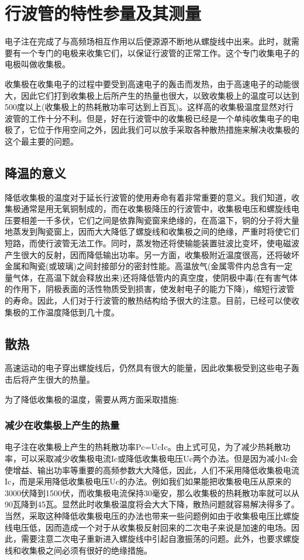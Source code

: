 \chapter{行波管的特性参量及其测量}
电子注在完成了与高频场相互作用以后便源源不断地从螺旋线中出来。此时，就需要有一个专门的电极来收集它们，以保证行波管的正常工作。这个专门收集电子的电极叫做收集极。


收集极在收集电子的过程中要受到高速电子的轰击而发热，由于高速电子的动能很大，因此它们打到收集极上后所产生的热量也很大，以致收集极上的温度可以达到500度以上(收集极上的热耗散功率可达到上百瓦)。这样高的收集极温度显然对行波管的工作十分不利。但是，好在行波管中的收集极已经是一个单纯收集电子的电极了，它位于作用空间之外，因此我们可以放手采取各种散热措施来解决收集极的这个最主要的问题。

\section{降温的意义}

降低收集极的温度对于延长行波管的使用寿命有着非常重要的意义。我们知道，收集极通常是用无氧铜制成的，而在收集极降压的行波管中，收集极电压和螺旋线电压要相差一千多伏，它们之间是依靠陶瓷窗来绝缘的，在高温下，铜的分子将大量地蒸发到陶瓷窗上，因而大大降低了螺旋线和收集极之间的绝缘，严重时将使它们短路，而使行波管无法工作。同时，蒸发物还将使输能装置驻波比变坏，使电磁波产生很大的反射，因而降低输出功率。另一方面，收集极附近温度很高，还将破坏金属和陶瓷(或玻璃)之间封接部分的密封性能。高温放气(金属零件内总含有一定量气体，在高温下就会释放出来)还将降低管内的真空度，使阴极中毒(在有害气体的作用下，阴极表面的活性物质受到损害，使发射电子的能力下降)，缩短行波管的寿命。因此，人们对于行波管的散热结构给予很大的注意。目前，已经可以使收集极的工作温度降低到几十度。
\section{散热}
高速运动的电子穿出螺旋线后，仍然具有很大的能量，因此收集极受到这些电子轰击后将产生很大的热量。


为了降低收集极的温度，需要从两方面采取措施:


\subsection{减少在收集极上产生的热量}

电子注在收集极上产生的热耗散功率Pc=UcIc。由上式可见，为了减少热耗散功率，可以采取减少收集极电流Ic或降低收集极电压Uc两个办法。但是因为减小Ic会使增益、输出功率等重要的高频参数大大降低，因此，人们不采用降低收集极电流Ic，而是采用降低收集极电压Uc的办法。例如我们如果能把收集极电压从原来的3000伏降到1500伏，而收集极电流保持30毫安，那么收集极的热耗散功率就可以从90瓦降到45瓦。显然此时收集极温度将会大大下降，散热问题就容易解决得多了。当然，采取这种降低收集极电压的办法也带来一些问题例如由于收集极电压比螺旋线电压低，因而造成一个对于从收集极反射回来的二次电子来说是加速的电场。因此，需要注意二次电子重新进入螺旋线中引起自激振荡的问题。此外，也要求螺旋线和收集极之间必须有很好的绝缘措施。

